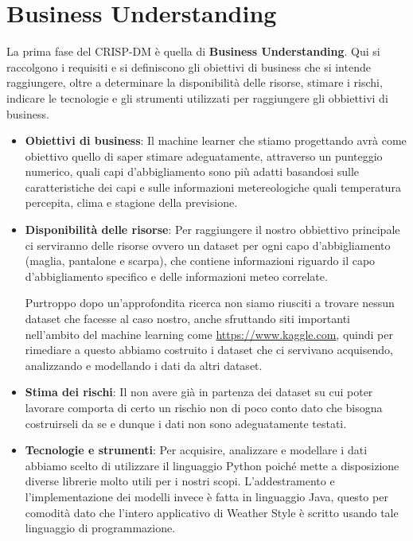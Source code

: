 \documentclass[a4paper, 11pt, oneside]{report}
\begin{document}
            \section{Business Understanding}
            La prima fase del CRISP-DM è quella di \textbf{Business Understanding}.
            Qui si raccolgono i requisiti e si definiscono gli obiettivi di business che si intende raggiungere, oltre a
            determinare la disponibilità delle risorse, stimare i rischi, indicare le tecnologie e gli strumenti utilizzati
            per raggiungere gli obbiettivi di business.
            \par \noindent
            \begin{itemize}
                \item \textbf{Obiettivi di business}: Il machine learner che stiamo progettando avrà come obiettivo quello di
                saper stimare adeguatamente, attraverso un punteggio numerico, quali capi d'abbigliamento sono più adatti basandosi
                sulle caratteristiche dei capi e sulle informazioni metereologiche quali temperatura percepita, clima e
                stagione della previsione.
                \item \textbf{Disponibilità delle risorse}: Per raggiungere il nostro obbiettivo principale ci serviranno
                delle risorse ovvero un dataset per ogni capo d'abbigliamento (maglia, pantalone e scarpa),
                che contiene informazioni riguardo il capo d'abbigliamento specifico e delle informazioni meteo correlate.
                \par \noindent Purtroppo dopo un'approfondita ricerca non siamo riusciti a trovare nessun dataset che facesse
                al caso nostro, anche sfruttando siti importanti nell'ambito del machine learning come \url{https://www.kaggle.com},
                quindi per rimediare a questo abbiamo costruito i dataset che ci servivano acquisendo, analizzando e modellando
                i dati da altri dataset.
                \item \textbf{Stima dei rischi}: Il non avere già in partenza dei dataset su cui poter lavorare comporta
                di certo un rischio non di poco conto dato che bisogna costruirseli da se e dunque i dati non sono adeguatamente testati.
                \item \textbf{Tecnologie e strumenti}: Per acquisire, analizzare e modellare i dati abbiamo scelto di utilizzare
                il linguaggio Python poiché mette a disposizione diverse librerie molto utili per i nostri scopi.
                L'addestramento e l'implementazione dei modelli invece è fatta in linguaggio Java, questo per comodità dato che
                l'intero applicativo di Weather Style è scritto usando tale linguaggio di programmazione.
            \end{itemize}
\end{document}
